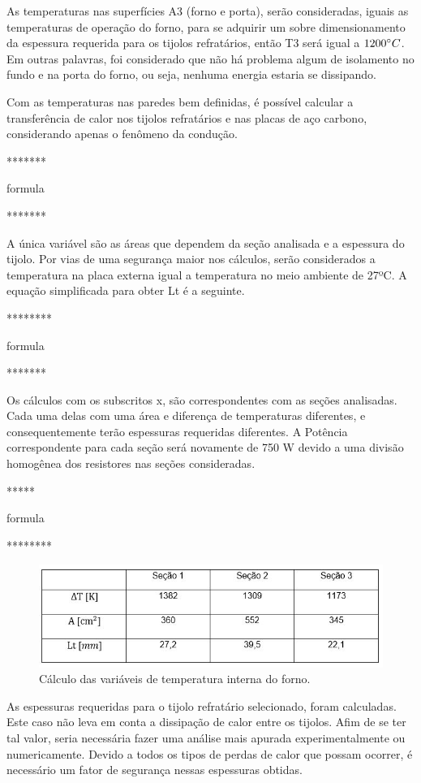 As temperaturas nas superfícies A3 (forno e porta), serão consideradas, iguais as temperaturas de operação do forno, para se adquirir um sobre dimensionamento da espessura requerida para os tijolos refratários, então T3 será igual a $1200\degree C$. Em outras palavras, foi considerado que não há problema algum de isolamento no fundo e na porta do forno, ou seja, nenhuma energia estaria se dissipando.

Com as temperaturas nas paredes bem definidas, é possível calcular a transferência de calor nos tijolos refratários e nas placas de aço carbono, considerando apenas o fenômeno da condução.

*******

formula

*******

 A única variável são as áreas que dependem da seção analisada e a espessura do tijolo. Por vias de uma segurança maior nos cálculos, serão considerados a temperatura na placa externa igual a temperatura no meio ambiente de 27ºC. A equação simplificada para obter Lt é a seguinte.
 
********

formula


*******
 
Os cálculos com os subscritos x, são correspondentes com as seções analisadas. Cada uma delas com uma área e diferença de temperaturas diferentes, e consequentemente terão espessuras requeridas diferentes. A Potência correspondente para cada seção será novamente de 750 W devido a uma divisão homogênea dos resistores nas seções consideradas.
 
*****

formula

********

\begin{figure}[H]
	\centering
	\label{tab}
	\includegraphics[keepaspectratio=true,scale=1.0]{figuras/tab.JPG}
	\caption{Cálculo das variáveis de temperatura interna do forno.}
\end{figure}

As espessuras requeridas para o tijolo refratário selecionado, foram calculadas. Este caso não leva em conta a dissipação de calor entre os tijolos. Afim de se ter tal valor, seria necessária fazer uma análise mais apurada experimentalmente ou numericamente.
Devido a todos os tipos de perdas de calor que possam ocorrer, é necessário um fator de segurança nessas espessuras obtidas. 

